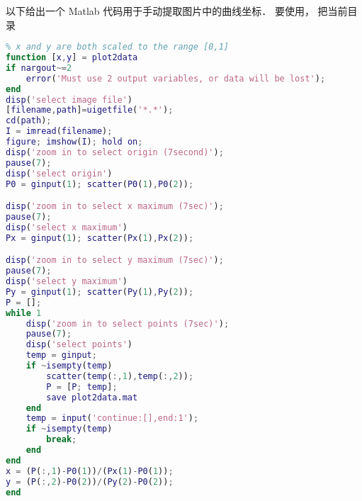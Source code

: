 

以下给出一个 Matlab 代码用于手动提取图片中的曲线坐标． 要使用， 把当前目录

\begin{lstlisting}[language=matlab]
% Data Extractor for Plot
% x and y are both scaled to the range [0,1]
function [x,y] = plot2data
if nargout~=2
    error('Must use 2 output variables, or data will be lost');
end
disp('select image file')
[filename,path]=uigetfile('*.*');
cd(path);
I = imread(filename);
figure; imshow(I); hold on;
disp('zoom in to select origin (7second)');
pause(7);
disp('select origin')
P0 = ginput(1); scatter(P0(1),P0(2));

disp('zoom in to select x maximum (7sec)');
pause(7);
disp('select x maximum')
Px = ginput(1); scatter(Px(1),Px(2));

disp('zoom in to select y maximum (7sec)');
pause(7);
disp('select y maximum')
Py = ginput(1); scatter(Py(1),Py(2));
P = [];
while 1
    disp('zoom in to select points (7sec)');
    pause(7);
    disp('select points')
    temp = ginput;
    if ~isempty(temp)
        scatter(temp(:,1),temp(:,2));
        P = [P; temp];
        save plot2data.mat
    end
    temp = input('continue:[],end:1');
    if ~isempty(temp)
        break;
    end
end
x = (P(:,1)-P0(1))/(Px(1)-P0(1));
y = (P(:,2)-P0(2))/(Py(2)-P0(2));
end
\end{lstlisting}
